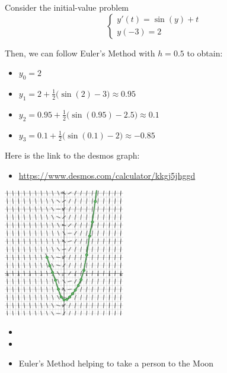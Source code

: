 \begin{example}
Consider the initial-value problem
$$
\begin{cases}
y'(t) = \sin(y)+t \\
y(-3)=2
\end{cases}
$$

\begin{minipage}{.65\textwidth}
Then, we can follow Euler's Method with $h=0.5$ to obtain:
\begin{itemize}
	\item $y_0=2$
	\item $y_1 = 2 + \frac12 \big(\sin(2) -3\big) \approx 0.95$
	\item $y_2 = 0.95 + \frac12 \big(\sin(0.95) -2.5\big) \approx 0.1$
	\item $y_3 = 0.1 + \frac12 \big(\sin(0.1) -2\big) \approx -0.85$
\end{itemize}

	
\begin{minipage}{220pt}
Here is the link to the desmos graph: 
\begin{itemize}
	\item \url{https://www.desmos.com/calculator/kkgj5jhggd}
\end{itemize}
\end{minipage}
\hfill
\begin{minipage}{55pt}
\end{minipage}
\end{minipage}
\hfill
\begin{minipage}{150pt}
	\includegraphics*[width=150pt]{images/module10-Euler-small.pdf}
\end{minipage}	

\end{example}


\begin{video}
\begin{itemize}
	\item {}
	\item {}
	\item Euler's Method helping to take a person to the Moon \hfill {}
\end{itemize}	
\end{video}





